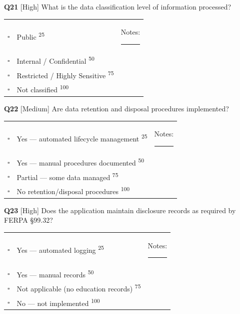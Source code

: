\documentclass[11pt,landscape]{article}
\begin{document}
\vspace{0.3cm}

\noindent\colorbox{highbg}{\textbf{Q21} [High]} What is the data classification level of information processed?

\begin{tabularx}{\textwidth}{cXX}
$\square$ & Public \textsuperscript{\scriptsize\textcolor{stridegray}{25}} & Notes: \rule{4cm}{0.4pt} \\
$\square$ & Internal / Confidential \textsuperscript{\scriptsize\textcolor{stridegray}{50}} &  \\
$\square$ & Restricted / Highly Sensitive \textsuperscript{\scriptsize\textcolor{stridegray}{75}} &  \\
$\square$ & Not classified \textsuperscript{\scriptsize\textcolor{stridegray}{100}} &  \\
\end{tabularx}

\vspace{0.3cm}

\noindent\colorbox{medbg}{\textbf{Q22} [Medium]} Are data retention and disposal procedures implemented?

\begin{tabularx}{\textwidth}{cXX}
$\square$ & Yes --- automated lifecycle management \textsuperscript{\scriptsize\textcolor{stridegray}{25}} & Notes: \rule{4cm}{0.4pt} \\
$\square$ & Yes --- manual procedures documented \textsuperscript{\scriptsize\textcolor{stridegray}{50}} &  \\
$\square$ & Partial --- some data managed \textsuperscript{\scriptsize\textcolor{stridegray}{75}} &  \\
$\square$ & No retention/disposal procedures \textsuperscript{\scriptsize\textcolor{stridegray}{100}} &  \\
\end{tabularx}

\vspace{0.3cm}

\noindent\colorbox{highbg}{\textbf{Q23} [High]} Does the application maintain disclosure records as required by FERPA §99.32?

\begin{tabularx}{\textwidth}{cXX}
$\square$ & Yes --- automated logging \textsuperscript{\scriptsize\textcolor{stridegray}{25}} & Notes: \rule{4cm}{0.4pt} \\
$\square$ & Yes --- manual records \textsuperscript{\scriptsize\textcolor{stridegray}{50}} &  \\
$\square$ & Not applicable (no education records) \textsuperscript{\scriptsize\textcolor{stridegray}{75}} &  \\
$\square$ & No --- not implemented \textsuperscript{\scriptsize\textcolor{stridegray}{100}} &  \\
\end{tabularx}
\end{document}

